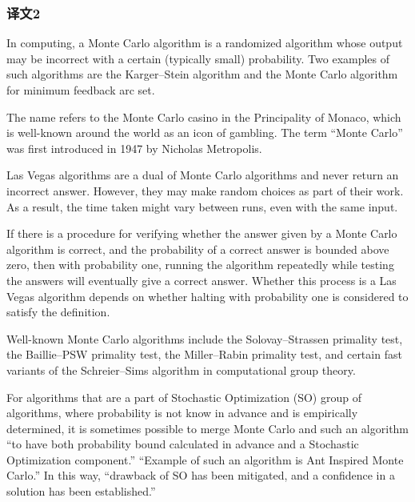 \subsubsection*{译文2}
In computing, a Monte Carlo algorithm is a randomized algorithm whose output may be incorrect with a certain (typically small) probability. Two examples of such algorithms are the Karger–Stein algorithm and the Monte Carlo algorithm for minimum feedback arc set.\par
The name refers to the Monte Carlo casino in the Principality of Monaco, which is well-known around the world as an icon of gambling. The term ``Monte Carlo'' was first introduced in 1947 by Nicholas Metropolis.\par
Las Vegas algorithms are a dual of Monte Carlo algorithms and never return an incorrect answer. However, they may make random choices as part of their work. As a result, the time taken might vary between runs, even with the same input.\par
If there is a procedure for verifying whether the answer given by a Monte Carlo algorithm is correct, and the probability of a correct answer is bounded above zero, then with probability one, running the algorithm repeatedly while testing the answers will eventually give a correct answer. Whether this process is a Las Vegas algorithm depends on whether halting with probability one is considered to satisfy the definition.\par
Well-known Monte Carlo algorithms include the Solovay–Strassen primality test, the Baillie–PSW primality test, the Miller–Rabin primality test, and certain fast variants of the Schreier–Sims algorithm in computational group theory.\par
For algorithms that are a part of Stochastic Optimization (SO) group of algorithms, where probability is not know in advance and is empirically determined, it is sometimes possible to merge Monte Carlo and such an algorithm ``to have both probability bound calculated in advance and a Stochastic Optimization component.'' ``Example of such an algorithm is Ant Inspired Monte Carlo.'' In this way, ``drawback of SO has been mitigated, and a confidence in a solution has been established.''\par
\clearpage
